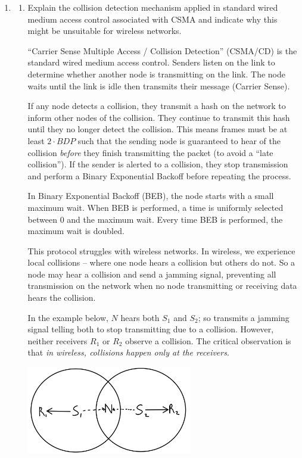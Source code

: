 \documentclass[10pt,\jkfside,a4paper]{article}
\begin{document}
\begin{enumerate}[label=(\alph*)]

\item

\begin{enumerate}[label=(\roman*)]

\item Explain the collision detection mechanism applied in standard wired
medium access control associated with CSMA and indicate why this might be
unsuitable for wireless networks.

``Carrier Sense Multiple Access / Collision Detection'' (CSMA/CD) is the
standard wired medium access control. Senders listen on the link
to determine whether another node is transmitting on the link. The node
waits until the link is idle then transmits their message (Carrier Sense).

If any node detects a collision, they transmit a hash on the network to
inform other nodes of the collision. They continue to transmit this hash
until they no longer detect the collision. This means frames must be at
least $2 \cdot BDP$ such that the sending node is guaranteed to hear of the
collision \textit{before} they finish transmitting the packet (to avoid a
``late collision''). If the sender is alerted to a collision, they stop
transmission and perform a Binary Exponential Backoff before repeating the
process.

In Binary Exponential Backoff (BEB), the node starts with a small maximum
wait. When BEB is performed, a time is uniformly selected between 0 and the
maximum wait. Every time BEB is performed, the maximum wait is doubled.

This protocol struggles with wireless networks. In wireless, we experience
local collisions -- where one node hears a collision but others do not. So a
node may hear a collision and send a jamming signal, preventing all
transmission on the network when no node transmitting or receiving data
hears the collision.

In the example below, $N$ hears both $S_1$ and $S_2$; so transmits a jamming
signal telling both to stop transmitting due to a collision. However,
neither receivers $R_1$ or $R_2$ observe a collision. The critical
observation is that \textit{in wireless, collisions happen only at the
receivers}.
\begin{center}
\includegraphics[width=0.6\textwidth]{csma_cd_failure}
\end{center}


\end{enumerate}
\end{enumerate}
\end{document}
